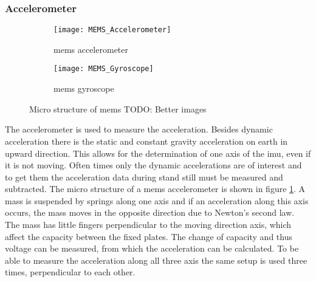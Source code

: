 \subsubsection{ Accelerometer}
\begin{figure}[htb]
	\centering
	\begin{subfigure}{0.48\textwidth}
		\centering
		\texttt{[image: MEMS\_Accelerometer]}
		\caption{\acrshort{mems} accelerometer}
		\label{fig:MEMS_Accelerometer}
	\end{subfigure}
	\begin{subfigure}{0.48\textwidth}
		\centering
		\texttt{[image: MEMS\_Gyroscope]}
		\caption{\acrshort{mems} gyroscope}
		\label{fig:MEMS_Gyroscope}
	\end{subfigure}
	\caption{Micro structure of \acrshort{mems} TODO: Better images}
	\label{fig:MEMS_design}
\end{figure}
The accelerometer is used to measure the acceleration.
Besides dynamic acceleration there is the static and constant gravity acceleration on earth in upward direction.
This allows for the determination of one axis of the \gls{imu}, even if it is not moving.
Often times only the dynamic accelerations are of interest and to get them the acceleration data during stand still must be measured and subtracted.
The micro structure of a \gls{mems} accelerometer is shown in figure \ref{fig:MEMS_Accelerometer}.
A mass is suspended by springs along one axis and if an acceleration along this axis occurs, the mass moves in the opposite direction due to Newton's second law.
The mass has little fingers perpendicular to the moving direction axis, which affect the capacity between the fixed plates.
The change of capacity and thus voltage can be measured, from which the acceleration can be calculated.
To be able to measure the acceleration along all three axis the same setup is used three times, perpendicular to each other.

